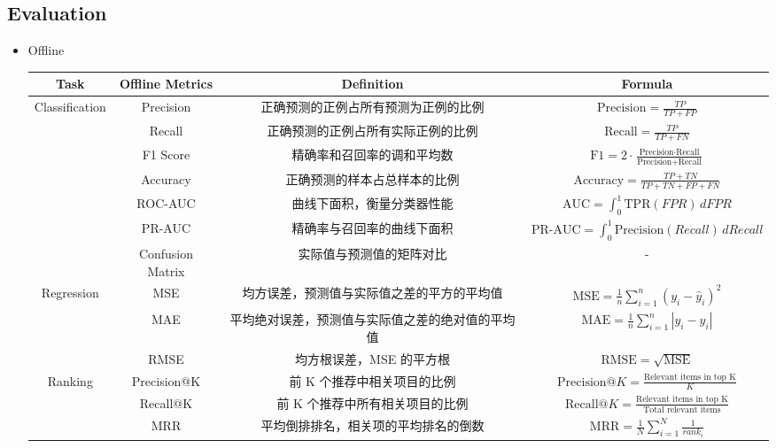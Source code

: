 \documentclass[12pt]{article}
\numberwithin{theorem}{section} %
\numberwithin{definition}{section} %
\numberwithin{assumption}{section} %
\numberwithin{lemma}{section} %
\numberwithin{remark}{section} %
\numberwithin{prop}{section} %
\numberwithin{corollary}{section} %
\numberwithin{example}{section} %
\numberwithin{question}{section} %
\numberwithin{problem}{section} %
\numberwithin{conjecture}{section} %
\numberwithin{append}{section} %
\numberwithin{property}{section} %
\begin{document}
\begin{CJK}{UTF8}{gbsn}
	\subsection{Evaluation}
	\begin{itemize}
		\item Offline
		\begin{table}[h]
			\centering
			\scriptsize %
			\begin{tabular}{|c|c|c|c|}
				\toprule
				\textbf{Task} & \textbf{Offline Metrics} & \textbf{Definition} & \textbf{Formula} \\
				\midrule
				\multirow{7}{*}{Classification} & Precision & 正确预测的正例占所有预测为正例的比例 & $ \text{Precision} = \frac{TP}{TP + FP} $ \\
				& Recall & 正确预测的正例占所有实际正例的比例 & $ \text{Recall} = \frac{TP}{TP + FN} $ \\
				& F1 Score & 精确率和召回率的调和平均数 & $ \text{F1} = 2 \cdot \frac{\text{Precision} \cdot \text{Recall}}{\text{Precision} + \text{Recall}} $ \\
				& Accuracy & 正确预测的样本占总样本的比例 & $ \text{Accuracy} = \frac{TP + TN}{TP + TN + FP + FN} $ \\
				& ROC-AUC & 曲线下面积，衡量分类器性能 & $ \text{AUC} = \int_0^1 \text{TPR}(FPR) \, dFPR $ \\
				& PR-AUC & 精确率与召回率的曲线下面积 & $ \text{PR-AUC} = \int_0^1 \text{Precision}(Recall) \, dRecall $ \\
				& Confusion Matrix & 实际值与预测值的矩阵对比 & - \\
				\midrule
				\multirow{3}{*}{Regression} & MSE & 均方误差，预测值与实际值之差的平方的平均值 & $ \text{MSE} = \frac{1}{n} \sum_{i=1}^{n} (y_i - \hat{y}_i)^2 $ \\
				& MAE & 平均绝对误差，预测值与实际值之差的绝对值的平均值 & $ \text{MAE} = \frac{1}{n} \sum_{i=1}^{n} |y_i - \hat{y}_i| $ \\
				& RMSE & 均方根误差，MSE 的平方根 & $ \text{RMSE} = \sqrt{\text{MSE}} $ \\
				\midrule
				\multirow{5}{*}{Ranking} & Precision@K & 前 K 个推荐中相关项目的比例 & $ \text{Precision}@K = \frac{\text{Relevant items in top K}}{K} $ \\
				& Recall@K & 前 K 个推荐中所有相关项目的比例 & $ \text{Recall}@K = \frac{\text{Relevant items in top K}}{\text{Total relevant items}} $ \\
				& MRR & 平均倒排排名，相关项的平均排名的倒数 & $ \text{MRR} = \frac{1}{N} \sum_{i=1}^{N} \frac{1}{rank_i} $ \\

\end{tabular}
\end{table}
\end{itemize}
\end{CJK}
\end{document}
